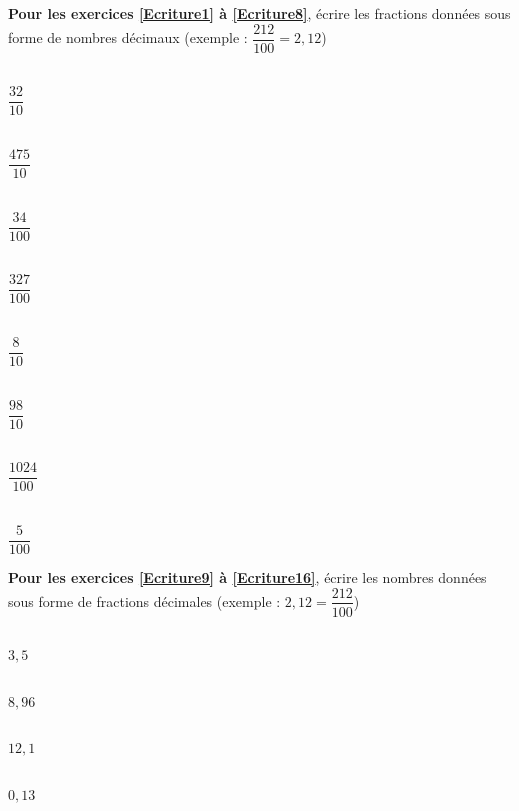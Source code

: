 \textbf{Pour les exercices \ref{Ecriture1} à \ref{Ecriture8}}, écrire les fractions données sous forme de nombres décimaux (exemple : $\dfrac{212}{100}=2,12$)

\begin{multicols}{4}
    \vspace{0.5em}\\
    $\dfrac{32}{10}$

    \vspace{0.5em}\\
    $\dfrac{475}{10}$

    \vspace{0.5em}\\
    $\dfrac{34}{100}$

    \vspace{0.5em}\\
    $\dfrac{327}{100}$
\end{multicols}

\begin{multicols}{4}
    \vspace{0.5em}\\
    $\dfrac{8}{10}$

    \vspace{0.5em}\\
    $\dfrac{98}{10}$

    \vspace{0.5em}\\
    $\dfrac{1024}{100}$

    \vspace{0.5em}\\
    $\dfrac{5}{100}$
\end{multicols}

\textbf{Pour les exercices \ref{Ecriture9} à \ref{Ecriture16}}, écrire les nombres données sous forme de fractions décimales (exemple : $2,12=\dfrac{212}{100}$)

\begin{multicols}{4}
    \\
    $3,5$

    \\
    $8,96$

    \\
    $12,1$

    \\
    $0,13$
\end{multicols}

